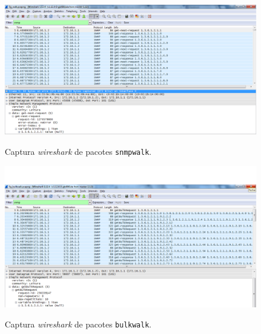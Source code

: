 \begin{figure}[h]
\centering
\includegraphics[width=1\textwidth, height=0.33\textheight]{5g_walk.png}
\label{fig:8-capturaWireshark}
\caption{Captura \emph{wireshark} de pacotes \texttt{snmpwalk}.}
\end{figure}

\begin{figure}[h]
\centering
\includegraphics[width=1\textwidth, height=0.33\textheight]{5g_bulkwalk.png}
\label{fig:9-capturaWireshark}
\caption{Captura \emph{wireshark} de pacotes \texttt{bulkwalk}.}
\end{figure}



